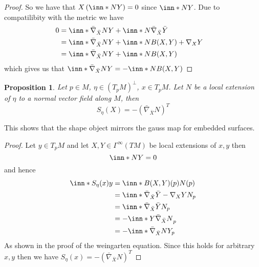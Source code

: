 \documentclass[a4paper]{article}
\newtheorem*{prop}{Proposition}
\begin{document}
\begin{proof}
  So we have that $X \left( \inn*{N}{Y} \right) = 0$ since $\inn*{N}{Y}$. Due to compatilibity  with the metric we have
  \[
    \begin{aligned}
      0 &= \inn*{\bar{\nabla}_{\bar{X}} N}{Y} + \inn*{N}{\bar{\nabla}_{\bar{X}}\bar{Y}} \\
        &= \inn*{\bar{\nabla}_{\bar{X}} N}{Y} + \inn*{N}{B(X,Y) + \nabla_X Y} \\
        &= \inn*{\bar{\nabla}_{\bar{X}} N}{Y} + \inn*{N}{B(X,Y)}
                                                                                 &
    \end{aligned}
  \]
  which gives us that $\inn*{\bar{\nabla}_{\bar{X}} N}{Y} = - \inn*{N}{B(X,Y)}$
\end{proof}

\begin{prop}
  Let $p \in M$, $\eta \in (T_pM)^\perp$, $x \in T_pM$. Let $N$ be a local extension of $\eta$ to a normal vector field along $M$,  then 
  \[
    S_\eta(X) = - (\bar{\nabla}_{\bar{X}} N)^T
  \]
\end{prop}
This shows that the shape object mirrors the gauss map for embedded surfaces.
\begin{proof}
  Let $y  \in T_pM$ and let $X,Y \in \Gamma^\infty(TM)$ be local extensions of $x,y$ then
  \[
    \inn*{N}{Y} = 0
  \]
  and hence
  \[
    \begin{aligned}
      \inn*{S_\eta(x)}{y} &= \inn*{B(X,Y)(p)}{N(p)} \\
                          &= \inn*{\bar{\nabla}_{\bar{X}}\bar{Y} - \nabla_X Y}{N}_p \\
                          &= \inn*{\bar{\nabla}_{\bar{X}}\bar{Y}}{N}_p \\
                          &= -\inn*{Y}{\bar{\nabla}_{\bar{X}} N}_p \\
                          &= -\inn*{\bar{\nabla}_{\bar{X}} N}{Y}_p
    \end{aligned}
  \]
  As shown in the proof of the weingarten equation. Since this holds for arbitrary $x,y$ then we have $S_\eta(x) = -(\bar{\nabla}_{\bar{X}}N)^T$
\end{proof}
\end{document}
